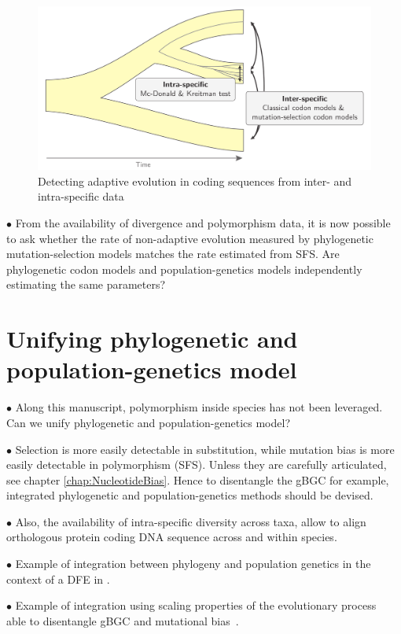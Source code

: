 \begin{figure}[H]
	\centering
	\includegraphics[width=\textwidth] {figures/inter-intra}
	\caption{Detecting adaptive evolution in coding sequences from inter- and intra-specific data}
\end{figure}

$\bullet$ From the availability of divergence and polymorphism data, it is now possible to ask whether the rate of non-adaptive evolution measured by phylogenetic mutation-selection models matches the rate estimated from SFS.
Are phylogenetic codon models and population-genetics models independently estimating the same parameters?

\section{Unifying phylogenetic and population-genetics model}
\label{sec:unifying-phylogenetic-and-population-genetics-model}

$\bullet$ Along this manuscript, polymorphism inside species has not been leveraged. Can we unify phylogenetic and population-genetics model?

$\bullet$ Selection is more easily detectable in substitution, while mutation bias is more easily detectable in polymorphism (SFS).
Unless they are carefully articulated, see chapter \ref{chap:NucleotideBias}.
Hence to disentangle the gBGC for example, integrated phylogenetic and population-genetics methods should be devised.

$\bullet$ Also, the availability of intra-specific diversity across taxa, allow to align orthologous protein coding DNA sequence across and within species.

$\bullet$ Example of integration between phylogeny and population genetics in the context of a DFE in \citet{Wilson2011}.

$\bullet$ Example of integration using scaling properties of the evolutionary process~\citep{DeMaio2013, Schrempf2016, Bergman2018, Schrempf2019} able to disentangle gBGC and mutational bias~\citep{Borges2019, Borges2020}.

